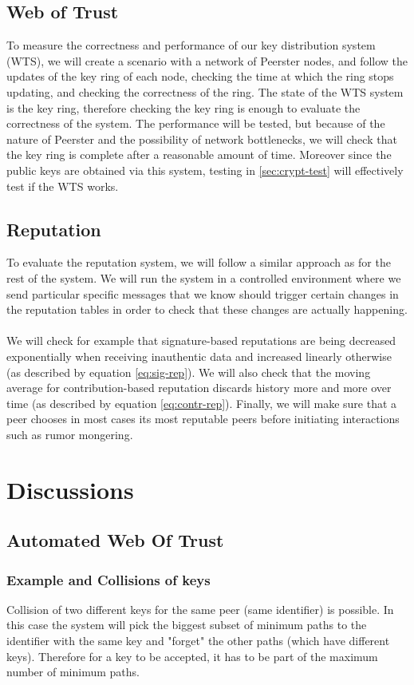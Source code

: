 \documentclass[]{article}
\begin{document}
\subsection{Web of Trust}
To measure the correctness and performance of our key distribution system (WTS), we will create a scenario with a network of Peerster nodes, and follow the updates of the key ring of each node, checking the time at which the ring stops updating, and checking the correctness of the ring. The state of the WTS system is the key ring, therefore checking the key ring is enough to evaluate the correctness of the system. The performance will be tested, but because of the nature of Peerster and the possibility of network bottlenecks, we will check that the key ring is complete after a reasonable amount of time. Moreover since the public keys are obtained via this system, testing in \ref{sec:crypt-test} will effectively test if the WTS works.

\subsection{Reputation}
To evaluate the reputation system, we will follow a similar approach as for the rest of the system.
We will run the system in a controlled environment where we send particular specific messages that we know should trigger certain changes in the reputation tables in order to check that these changes are actually happening.
\\\\
We will check for example that signature-based reputations are being decreased exponentially when receiving inauthentic data and increased linearly otherwise (as described by equation \ref{eq:sig-rep}).
We will also check that the moving average for contribution-based reputation discards history more and more over time (as described by equation \ref{eq:contr-rep}).
Finally, we will make sure that a peer chooses in most cases its most reputable peers before initiating interactions such as rumor mongering.

\section{Discussions}

\subsection{Automated Web Of Trust}

\subsubsection{Example and Collisions of keys}
Collision of two different keys for the same peer (same identifier) is possible. In this case the system will pick the biggest subset of minimum paths to the identifier with the same key and "forget" the other paths (which have different keys). Therefore for a key to be accepted, it has to be part of the maximum number of minimum paths.
\end{document}
